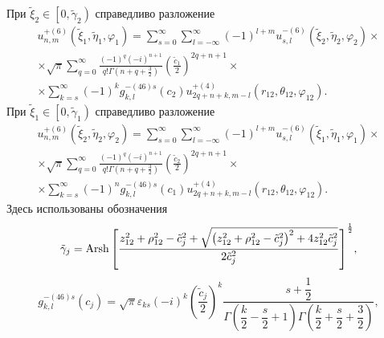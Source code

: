 \begin{theorem}
При ${\tilde \xi _2} \in \left[ {0,{{\tilde \gamma }_2}} \right)$ справедливо разложение
\begin{multline}\label{eq:1:33}
u_{n,m}^{ + (6)}\left( {{{\tilde \xi }_1},{{\tilde \eta }_1},{\varphi _1}} \right) = \sum\limits_{s = 0}^\infty  {\sum\limits_{l =  - \infty }^\infty  {{{( - 1)}^{l + m}}} } u_{s,l}^{ - (6)}\left( {{{\tilde \xi }_2},{{\tilde \eta }_2},{\varphi _2}} \right) \times \\
\times \sqrt \pi  \sum\limits_{q = 0}^\infty  {\frac{{{{( - 1)}^q}{{( - i)}^{n + 1}}}}{{q!\Gamma \left( {n + q + \frac{3}{2}} \right)}}} {\left( {\frac{{{{\tilde c}_1}}}{2}} \right)^{2q + n + 1}} \times \\
\times \sum\limits_{k = s}^\infty  {{{( - 1)}^k}} g_{k,l}^{ - (46)s}({c_2})u_{2q + n + k,m - l}^{ + (4)}\left( {{r_{12}},{\theta _{12}},{\varphi _{12}}} \right).
\end{multline}
При ${\tilde \xi _1} \in \left[ {0,{{\tilde \gamma }_1}} \right)$ справедливо разложение
\begin{multline}\label{eq:1:34}
u_{n,m}^{ + (6)}\left( {{{\tilde \xi }_2},{{\tilde \eta }_2},{\varphi _2}} \right) = \sum\limits_{s = 0}^\infty  {\sum\limits_{l =  - \infty }^\infty  {{{( - 1)}^{l + m}}} } u_{s,l}^{ - (6)}\left( {{{\tilde \xi }_1},{{\tilde \eta }_1},{\varphi _1}} \right) \times \\
\times \sqrt \pi  \sum\limits_{q = 0}^\infty  {\frac{{{{( - 1)}^q}{{( - i)}^{n + 1}}}}{{q!\Gamma \left( {n + q + \frac{3}{2}} \right)}}} {\left( {\frac{{{{\tilde c}_2}}}{2}} \right)^{2q + n + 1}} \times \\
\times \sum\limits_{k = s}^\infty  {{{( - 1)}^n}} g_{k,l}^{ - (46)s}({c_1})u_{2q + n + k,m - l}^{ + (4)}\left( {{r_{12}},{\theta _{12}},{\varphi _{12}}} \right).
\end{multline}
Здесь использованы обозначения
\begin{equation}\label{eq:1:35}
{\tilde \gamma _j} = {\rm{Arsh}}{\mkern 1mu} {\kern 1pt} {\left[ {\frac{{z_{12}^2 + \rho _{12}^2 - \tilde c_j^2 + \sqrt {\left( {z_{12}^2 + \rho _{12}^2 - \tilde c_j^2} \right)^2 + 4z_{12}^2\tilde c_j^2} }}{{2\tilde c_j^2}}} \right]^{\frac{1}{2}}},
\end{equation}
\begin{equation}\label{eq:1:36}
g_{k,l}^{ - (46)s}({c_j}) = \sqrt \pi  {\varepsilon _{ks}}{( - i)^k}{\left( {\dfrac{{{{\tilde c}_j}}}{2}} \right)^k}\dfrac{{s + \dfrac{1}{2}}}{{\Gamma \left( {\dfrac{k}{2} - \dfrac{s}{2} + 1} \right)\Gamma \left( {\dfrac{k}{2} + \dfrac{s}{2} + \dfrac{3}{2}} \right)}},
\end{equation}
\end{theorem}
